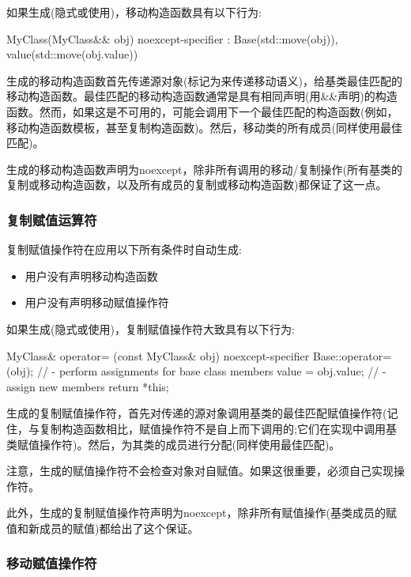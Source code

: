 如果生成(隐式或使用)，移动构造函数具有以下行为:

\begin{cppcode}
MyClass(MyClass&& obj) noexcept-specifier
: Base(std::move(obj)), value(std::move(obj.value)) {
}
\end{cppcode}

生成的移动构造函数首先传递源对象(标记为来传递移动语义)，给基类最佳匹配的移动构造函数。最佳匹配的移动构造函数通常是具有相同声明(用\&\&声明)的构造函数。然而，如果这是不可用的，可能会调用下一个最佳匹配的构造函数(例如，移动构造函数模板，甚至复制构造函数)。然后，移动类的所有成员(同样使用最佳匹配)。

生成的移动构造函数声明为noexcept，除非所有调用的移动/复制操作(所有基类的复制或移动构造函数，以及所有成员的复制或移动构造函数)都保证了这一点。

\subsubsection{复制赋值运算符}

复制赋值操作符在应用以下所有条件时自动生成:

\begin{itemize}
	\item 用户没有声明移动构造函数
	\item 用户没有声明移动赋值操作符
\end{itemize}

如果生成(隐式或使用)，复制赋值操作符大致具有以下行为:

\begin{cppcode}
MyClass& operator= (const MyClass& obj) noexcept-specifier {
	Base::operator=(obj); // - perform assignments for base class members
	value = obj.value; // - assign new members
	return *this;
}
\end{cppcode}

生成的复制赋值操作符，首先对传递的源对象调用基类的最佳匹配赋值操作符(记住，与复制构造函数相比，赋值操作符不是自上而下调用的;它们在实现中调用基类赋值操作符)。然后，为其类的成员进行分配(同样使用最佳匹配)。

注意，生成的赋值操作符不会检查对象对自赋值。如果这很重要，必须自己实现操作符。

此外，生成的复制赋值操作符声明为noexcept，除非所有赋值操作(基类成员的赋值和新成员的赋值)都给出了这个保证。

\subsubsection{移动赋值操作符}

